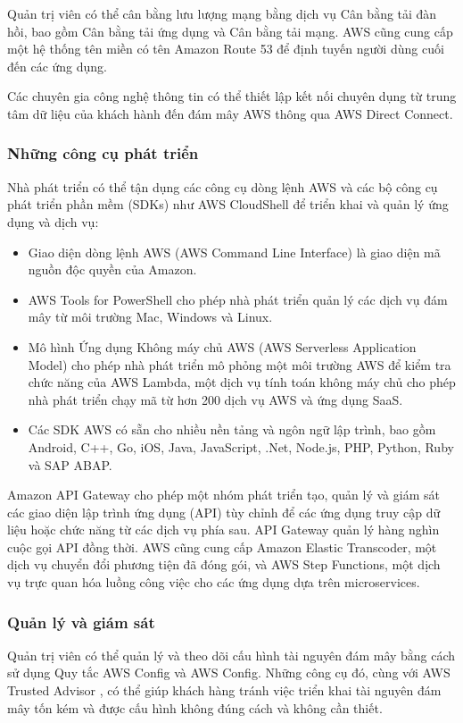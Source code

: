 Quản trị viên có thể cân bằng lưu lượng mạng bằng dịch vụ Cân bằng tải đàn hồi, bao gồm Cân bằng tải ứng dụng và Cân bằng tải mạng. AWS cũng cung cấp một hệ thống tên miền có tên Amazon Route 53 để định tuyến người dùng cuối đến các ứng dụng.

Các chuyên gia công nghệ thông tin có thể thiết lập kết nối chuyên dụng từ trung tâm dữ liệu của khách hành đến đám mây AWS thông qua AWS Direct Connect.
\subsubsection{Những công cụ phát triển}
Nhà phát triển có thể tận dụng các công cụ dòng lệnh AWS và các bộ công cụ phát triển phần mềm (SDKs) như AWS CloudShell để triển khai và quản lý ứng dụng và dịch vụ:
\begin{itemize}
    \item Giao diện dòng lệnh AWS (AWS Command Line Interface) là giao diện mã nguồn độc quyền của Amazon.
    \item AWS Tools for PowerShell cho phép nhà phát triển quản lý các dịch vụ đám mây từ môi trường Mac, Windows và Linux.
    \item Mô hình Ứng dụng Không máy chủ AWS (AWS Serverless Application Model) cho phép nhà phát triển mô phỏng một môi trường AWS để kiểm tra chức năng của AWS Lambda, một dịch vụ tính toán không máy chủ cho phép nhà phát triển chạy mã từ hơn 200 dịch vụ AWS và ứng dụng SaaS.
    \item Các SDK AWS có sẵn cho nhiều nền tảng và ngôn ngữ lập trình, bao gồm Android, C++, Go, iOS, Java, JavaScript, .Net, Node.js, PHP, Python, Ruby và SAP ABAP.
\end{itemize}
Amazon API Gateway \cite{aws_api_gateway} cho phép một nhóm phát triển tạo, quản lý và giám sát các giao diện lập trình ứng dụng (API) tùy chỉnh để các ứng dụng truy cập dữ liệu hoặc chức năng từ các dịch vụ phía sau. API Gateway quản lý hàng nghìn cuộc gọi API đồng thời.
AWS cũng cung cấp Amazon Elastic Transcoder, một dịch vụ chuyển đổi phương tiện đã đóng gói, và AWS Step Functions, một dịch vụ trực quan hóa luồng công việc cho các ứng dụng dựa trên microservices.
\subsubsection{Quản lý và giám sát}
Quản trị viên có thể quản lý và theo dõi cấu hình tài nguyên đám mây bằng cách sử dụng Quy tắc AWS Config và AWS Config. Những công cụ đó, cùng với AWS Trusted Advisor \cite{aws_trusted_advisor}, có thể giúp khách hàng tránh việc triển khai tài nguyên đám mây tốn kém và được cấu hình không đúng cách và không cần thiết.

